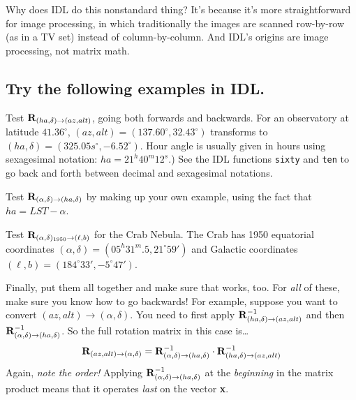 \documentclass[11pt,preprint]{aastex}
\begin{document}
	Why does IDL do this nonstandard thing? It's because it's more
straightforward for image processing, in which traditionally the images
are scanned row-by-row (as in a TV set) instead of column-by-column. And
IDL's origins are image processing, not matrix math.

\subsection {Try the following examples in IDL.}

Test ${\bf R}_{(ha, \delta) \rightarrow (az, alt)}$, going both forwards
and backwards. For an observatory at latitude $41.36^\circ$,
$(az,alt)=(137.60^\circ,32.43^\circ)$ transforms to
$(ha,\delta)=(325.05s^\circ, -6.52^\circ)$.  Hour angle is usually given
in hours using sexagesimal notation: $ha=21^h40^m12^{s}$.) See the IDL
functions {\tt sixty} and {\tt ten} to go back and forth between decimal
and sexagesimal notations.

	Test ${\bf R}_{(\alpha, \delta) \rightarrow (ha, \delta)}$ by
making up your own example, using the fact that $ha = LST - \alpha$. 

	Test ${\bf R}_{(\alpha, \delta)_{1950} \rightarrow (\ell, b)}$
for the Crab Nebula. The Crab has 1950
equatorial coordinates $(\alpha, \delta)=(05^h31^m.5, 21^\circ59')$ and
Galactic coordinates $(\ell,b)=(184^\circ33', -5^\circ47')$.

	Finally, put them all together and make sure that works, too. 
For {\it all} of these, make sure you know how to go backwards! For
example, suppose you want to convert $(az, alt) \rightarrow (\alpha,
\delta)$.  You need to first apply ${\bf R}_{(ha, \delta) \rightarrow
(az, alt)}^{-1}$ and then ${\bf R}_{(\alpha, \delta) \rightarrow (ha,
\delta)}^{-1}$.  So the full rotation matrix in this case is\dots
\begin{equation}
{\bf R}_{(az, alt) \rightarrow (\alpha, \delta)} = 
{\bf R}_{(\alpha, \delta) \rightarrow (ha, \delta)}^{-1} \cdot
{\bf R}_{(ha, \delta) \rightarrow (az, alt)}^{-1}
\end{equation}
\noindent Again, {\it note the order!} Applying ${\bf R}_{(\alpha,
\delta) \rightarrow (ha, \delta)}^{-1}$ at the {\it beginning} in the
matrix product means that it operates {\it last} on the vector {\bf x}. 

%
%
\end{document}
